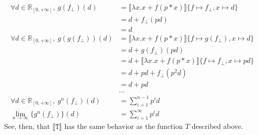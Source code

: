 \documentclass{westhesis}
\newcommand{\R}{\mathbb{R}}
\begin{document}
 \begin{align*}
 \forall d \in \R_{[0,+\infty]}, \ g(f_{\perp})(d) &= \llbracket \lambda x.x + f(p*x)\rrbracket\{f \mapsto f_{\perp}, x \mapsto d\} \\
 &= d + f_{\perp}(pd) \\
 &= d  \\
 \forall d \in \R_{[0,+\infty]}, \ g(g(f_{\perp}))(d) &= \llbracket \lambda x.x + f(p*x)\rrbracket\{f \mapsto g(f_{\perp}),x\mapsto d\} \\
 &= d + g(f_\perp)(pd) \\
 &= d + \llbracket \lambda x.x + f(p * x)\rrbracket\{f\mapsto f_\perp, x\mapsto pd\} \\
 &= d + pd + f_\perp(p^2d) \\
 &= d + pd \\ 
 &\ldots \\
 \forall d \in \R_{[0,+\infty]}, \ g^n(f_{\perp})(d) &= \sum_{i=1}^{n-1} p^{i}d \\
 \lim_{n \to \infty}\{g^n (f_{\perp})\}(d) &= \sum_{i=1}^{\infty} p^{i}d 
 \end{align*}
 See, then, that $\llbracket \texttt{T} \rrbracket$ has the same behavior as the function $T$ described above.
\end{document}
